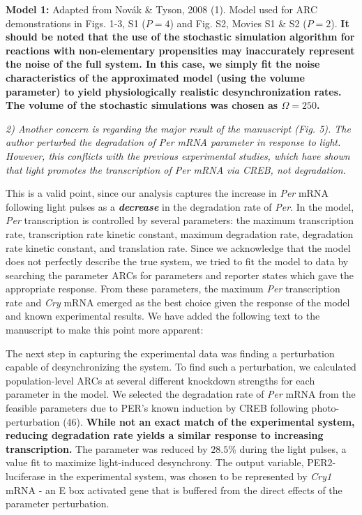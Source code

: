 \documentclass[11pt, letterpaper]{article}
\newenvironment{reviewer}{\itshape\color{gray}}{}
\newenvironment{manuscript}[1]{\begin{center}\begin{tcolorbox}[colback=green!5!white,colframe=green!75!black,width=0.8\textwidth,title={#1},breakable,fonttitle=\bfseries]}{\end{tcolorbox}\end{center}}
\begin{document}
\begin{manuscript}{Supplemental Info, Page 6}
{\bfseries Model 1:}
Adapted from Nov\'{a}k \& Tyson, 2008 (1). Model used for
ARC demonstrations in Figs. 1-3, S1 ($P=4$) and Fig. S2, Movies S1 \& S2
($P=2$).
{\bfseries It should be noted that the use of the stochastic simulation algorithm for reactions with non-elementary propensities may inaccurately represent the noise of the full system.
In this case, we simply fit the noise characteristics of the approximated model (using the volume parameter) to yield physiologically realistic desynchronization rates. The volume of the stochastic simulations was chosen as $\Omega = 250$.}
\end{manuscript}

\begin{reviewer}
2) Another concern is regarding the major result of the manuscript (Fig. 5). The author perturbed the degradation of Per mRNA parameter in response to light. However, this conflicts with the previous experimental studies, which have shown that light promotes the transcription of Per mRNA via CREB, not degradation. 
\end{reviewer}

This is a valid point, since our analysis captures the increase in {\itshape Per} mRNA following light pulses as a {\itshape\bfseries decrease} in the degradation rate of {\itshape Per}.
In the model, {\itshape Per} transcription is controlled by several parameters: the maximum transcription rate, transcription rate kinetic constant, maximum degradation rate, degradation rate kinetic constant, and translation rate.
Since we acknowledge that the model does not perfectly describe the true system, we tried to fit the model to data by searching the parameter ARCs for parameters and reporter states which gave the appropriate response. 
From these parameters, the maximum {\itshape Per} transcription rate and {\itshape Cry} mRNA emerged as the best choice given the response of the model and known experimental results. We have added the following text to the manuscript to make this point more apparent:

\begin{manuscript}{Page 16}
The next step in capturing the experimental data was finding a perturbation capable of desynchronizing the system.
To find such a perturbation, we calculated population-level ARCs at several different knockdown strengths for each parameter in the model.
We selected the degradation rate of {\itshape Per} mRNA from the feasible parameters due to PER's known induction by CREB following photo-perturbation (46). 
{\bfseries While not an exact match of the experimental system, reducing degradation rate yields a similar response to increasing transcription.}
The parameter was reduced by $28.5\%$ during the light pulses, a value fit to maximize light-induced desynchrony.
The output variable, PER2-luciferase in the experimental system, was chosen to be represented by {\itshape Cry1} mRNA - an E box activated gene that is buffered from the direct effects of the parameter perturbation.
\end{manuscript}
\end{document}
